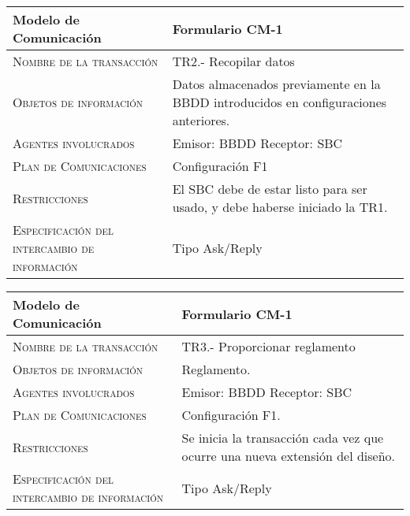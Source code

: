\documentclass[12pt,a4paper,twoside,spanish]{article}      %
\begin{document}
\begin{table}[H]
\scriptsize
\begin{tabularx}{\textwidth}{|l|X|} \hline
\textbf{Modelo de Comunicación} & \textbf{Formulario CM-1} \\ \hline\hline

\textsc{Nombre de la transacción} & TR2.- Recopilar datos

\\ \hline
\textsc{Objetos de información} & Datos almacenados previamente en la BBDD introducidos en configuraciones anteriores. 
\\ \hline
\textsc{Agentes involucrados} &  Emisor: BBDD
                                 Receptor: SBC \\ \hline
\textsc{Plan de Comunicaciones} &  Configuración F1
\\ \hline
\textsc{Restricciones} &  El SBC debe de estar listo para ser usado, y debe haberse iniciado la TR1. \\ \hline
\textsc{Especificación del intercambio de información} &  Tipo Ask/Reply\\ \hline
\end{tabularx}
  \label{tab.CM1_2}
\end{table}

\begin{table}[H]
\scriptsize
\begin{tabularx}{\textwidth}{|l|X|} \hline
\textbf{Modelo de Comunicación} & \textbf{Formulario CM-1} \\ \hline\hline

\textsc{Nombre de la transacción} & TR3.- Proporcionar reglamento

\\ \hline
\textsc{Objetos de información} & Reglamento.
\\ \hline
\textsc{Agentes involucrados} &  Emisor: BBDD
                                 Receptor: SBC \\ \hline
\textsc{Plan de Comunicaciones} &  Configuración F1.
\\ \hline
\textsc{Restricciones} &  Se inicia la transacción cada vez que ocurre una nueva extensión del diseño. \\ \hline
\textsc{Especificación del intercambio de información} &  Tipo Ask/Reply\\ \hline
\end{tabularx}
  \label{tab.CM1_2}
\end{table}
\end{document}
